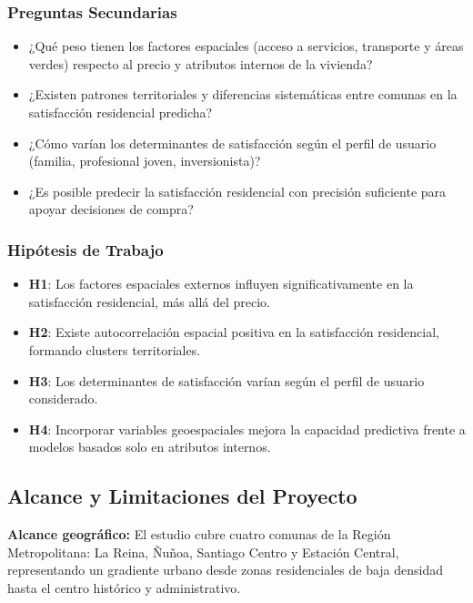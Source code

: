 \documentclass[11pt,letterpaper]{article}
\begin{document}
\subsubsection{Preguntas Secundarias}
\begin{itemize}
    \item ¿Qué peso tienen los factores espaciales (acceso a servicios, transporte y áreas verdes) respecto al precio y atributos internos de la vivienda?
    \item ¿Existen patrones territoriales y diferencias sistemáticas entre comunas en la satisfacción residencial predicha?
    \item ¿Cómo varían los determinantes de satisfacción según el perfil de usuario (familia, profesional joven, inversionista)?
    \item ¿Es posible predecir la satisfacción residencial con precisión suficiente para apoyar decisiones de compra?
\end{itemize}

\subsubsection{Hipótesis de Trabajo}
\begin{itemize}
    \item \textbf{H1}: Los factores espaciales externos influyen significativamente en la satisfacción residencial, más allá del precio.
    \item \textbf{H2}: Existe autocorrelación espacial positiva en la satisfacción residencial, formando clusters territoriales.
    \item \textbf{H3}: Los determinantes de satisfacción varían según el perfil de usuario considerado.
    \item \textbf{H4}: Incorporar variables geoespaciales mejora la capacidad predictiva frente a modelos basados solo en atributos internos.
\end{itemize}

\subsection{Alcance y Limitaciones del Proyecto}

\textbf{Alcance geográfico:} El estudio cubre cuatro comunas de la Región Metropolitana: La Reina, Ñuñoa, Santiago Centro y Estación Central, representando un gradiente urbano desde zonas residenciales de baja densidad hasta el centro histórico y administrativo.
\end{document}
